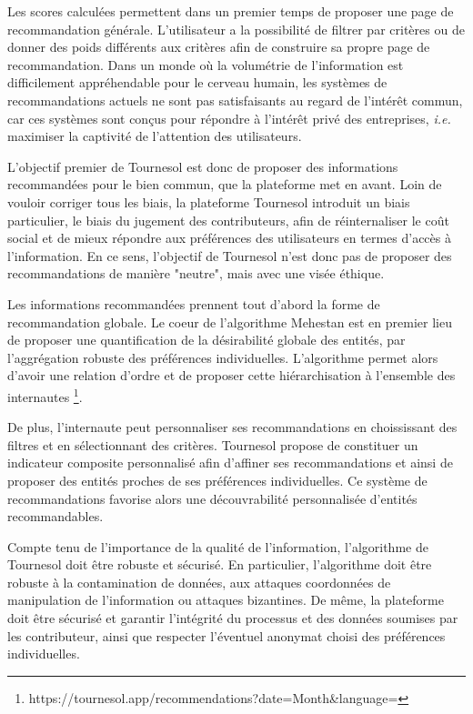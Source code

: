 Les scores calculées permettent dans un premier temps de proposer une page de recommandation générale. L'utilisateur a la possibilité de filtrer par critères ou de donner des poids différents aux critères afin de construire sa propre page de recommandation. Dans un monde où la volumétrie de l'information est difficilement appréhendable pour le cerveau humain, les systèmes de recommandations actuels ne sont pas satisfaisants au regard de l'intérêt commun, car ces systèmes sont conçus pour répondre à l'intérêt privé des entreprises, \textit{i.e.} maximiser la captivité de l'attention des utilisateurs. 

L'objectif premier de Tournesol est donc de proposer des informations recommandées pour le bien commun, que la plateforme met en avant. Loin de vouloir corriger tous les biais, la plateforme Tournesol introduit un biais particulier, le biais du jugement des contributeurs, afin de réinternaliser le coût social et de mieux répondre aux préférences des utilisateurs en termes d'accès à l'information. En ce sens, l'objectif de Tournesol n'est donc pas de proposer des recommandations de manière "neutre", mais avec une visée éthique.

Les informations recommandées prennent tout d'abord la forme de recommandation globale. Le coeur de l'algorithme Mehestan est en premier lieu de proposer une quantification de la désirabilité globale des entités, par l'aggrégation robuste des préférences individuelles. L'algorithme permet alors d'avoir une relation d'ordre et de proposer cette hiérarchisation à l'ensemble des internautes \footnote{https://tournesol.app/recommendations?date=Month&language=}.

De plus, l'internaute peut personnaliser ses recommandations en choississant des filtres et en sélectionnant des critères. Tournesol propose de constituer un indicateur composite personnalisé afin d'affiner ses recommandations et ainsi de proposer des entités proches de ses préférences individuelles. Ce système de recommandations favorise alors une découvrabilité personnalisée d'entités recommandables.

Compte tenu de l'importance de la qualité de l'information, l'algorithme de Tournesol doit être robuste et sécurisé. En particulier, l'algorithme doit être robuste à la contamination de données, aux attaques coordonnées de manipulation de l'information ou attaques bizantines. De même, la plateforme doit être sécurisé et garantir l'intégrité du processus et des données soumises par les contributeur, ainsi que respecter l'éventuel anonymat choisi des préférences individuelles.


